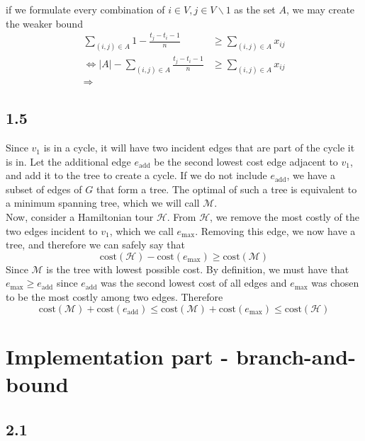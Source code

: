 \documentclass[12pt]{article}
\begin{document}
if we formulate every combination of $i\in V, j \in V\backslash {1}$ as the set $A$, we may create the weaker bound
\begin{align*}
\sum_{(i,j)\in A} 1 - \frac{t_j - t_i - 1}{n} & \geq \sum_{(i,j)\in A} x_{ij}\\
\Leftrightarrow |A| - \sum_{(i,j)\in A} \frac{t_j - t_i - 1}{n} & \geq \sum_{(i,j)\in A} x_{ij}\\
\Rightarrow 
\end{align*}

\subsection*{1.5}

Since $v_1$ is in a cycle, it will have two incident edges that are part of the cycle it is in. Let the additional edge $e_\text{add}$ be the second lowest cost edge adjacent to $v_1$, and add it to the tree to create a cycle. If we do not include $e_\text{add}$, we have a subset of edges of $G$ that form a tree. The optimal of such a tree is equivalent to a minimum spanning tree, which we will call $\mathcal{M}$.\\
Now, consider a Hamiltonian tour $\mathcal{H}$. From $\mathcal{H}$, we remove the most costly of the two edges incident to $v_1$, which we call $e_{\max}$. Removing this edge, we now have a tree, and therefore we can safely say that
$$
\text{cost}(\mathcal{H} ) - \text{cost}(e_{\max}) \geq \text{cost}(\mathcal{M})
$$
Since $\mathcal{M}$ is the tree with lowest possible cost. By definition, we must have that $e_{\max} \geq e_\text{add}$ since $e_\text{add}$ was the second lowest cost of all edges and $e_{\max}$ was chosen to be the most costly among two edges. Therefore
$$
\text{cost}(\mathcal{M}) + \text{cost}(e_\text{add}) \leq \text{cost}(\mathcal{M}) + \text{cost}(e_\text{max}) \leq \text{cost}(\mathcal{H})
$$


\section*{Implementation part - branch-and-bound}
\subsection*{2.1}
\end{document}
